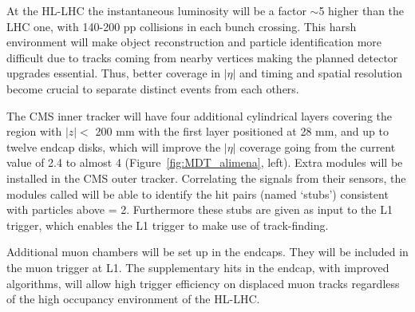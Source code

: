 At the HL-LHC the
instantaneous luminosity will be a factor $\sim$5 higher than the LHC
one, with 140-200 pp collisions in each bunch crossing. This harsh
environment will make object reconstruction and particle
identification more difficult due to tracks coming from nearby
vertices making the planned detector upgrades essential. Thus, better coverage in $|\eta|$ and timing and spatial
resolution become crucial to
separate distinct events from each others. 


The CMS inner tracker will have four additional cylindrical 
layers covering the region with $|z| < $ 200 mm with the first layer positioned at
28 mm, and up to twelve endcap
disks, which will improve the $|\eta|$ coverage going from the current
value of 2.4 to almost 4 (Figure~\ref{fig:MDT_alimena}, left).
Extra modules will be installed in
the CMS outer tracker. Correlating the signals from their sensors, the modules called \pt will be able to identify
the hit pairs (named ‘stubs’) consistent with particles above \pt =
2\GeV. Furthermore these stubs are given as input to the L1 trigger, which enables the L1 trigger to make use of track-finding.

Additional muon chambers will be set up in the endcaps. They will be included in
the muon trigger at L1. The supplementary hits in the
endcap, with improved algorithms, will allow high trigger efficiency 
on displaced muon tracks regardless of the high occupancy environment of the HL-LHC.
 

